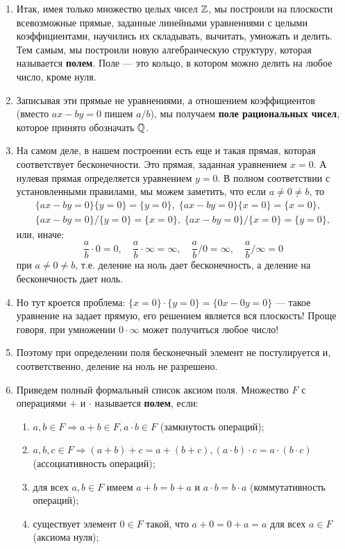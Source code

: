 \begin{enumerate}
\item Итак, имея только множество целых чисел $\mathbb Z$, мы построили на плоскости всевозможные прямые, заданные линейными уравнениями с целыми коэффициентами, научились их складывать, вычитать, умножать и делить. Тем самым, мы построили новую алгебраическую структуру, которая называется \textbf{полем}. Поле --- это кольцо, в котором можно делить на любое число, кроме нуля.
\item Записывая эти прямые не уравнениями, а отношением коэффициентов (вместо $ax-by=0$ пишем $a/b$), мы получаем \textbf{поле рациональных чисел}, которое принято обозначать $\mathbb Q$.
\item На самом деле, в нашем построении есть еще и такая прямая, которая соответствует бесконечности. Это прямая, заданная уравнением $x=0$. А нулевая прямая определяется уравнением $y=0$. В полном соответствии с установленными правилами, мы можем заметить, что если $a\ne 0 \ne b$, то
\begin{gather*}
\{ax-by=0\}\{y=0\}=\{y=0\},\;\{ax-by=0\}\{x=0\}=\{x=0\},\\ 
\{ax-by=0\}/\{y=0\}=\{x=0\},\;\{ax-by=0\}/\{x=0\}=\{y=0\},
\end{gather*}
или, иначе:
$$
\frac{a}{b}\cdot 0 = 0,\quad\frac{a}{b}\cdot\infty = \infty,\quad
\frac{a}{b}/ 0 = \infty,\quad\frac{a}{b}/\infty = 0
$$
при $a\ne 0\ne b$,
т.е. деление на ноль дает бесконечность, а деление на бесконечность дает ноль.
\item Но тут кроется проблема: $\{x=0\}\cdot\{y=0\}=\{0x-0y=0\}$ --- такое уравнение на задает прямую, его решением является вся плоскость! Проще говоря, при умножении $0\cdot\infty$ может получиться любое число!
\item Поэтому при определении поля бесконечный элемент не постулируется и, соответственно, деление на ноль не разрешено.
\item Приведем полный формальный список аксиом поля. Множество $F$ с операциями $+$ и $\cdot$ называется \textbf{полем}, если:
\begin{enumerate}[{\bf F}1)]
\item $a,b\in F\Rightarrow a+b\in F, a\cdot b\in F$ (замкнутость операций);
\item $a,b,c\in F\Rightarrow (a+b)+c=a+(b+c), (a\cdot b)\cdot c = a\cdot (b\cdot c)$ (ассоциативность операций);
\item для всех $a,b\in F$ имеем $a+b=b+a$ и $a\cdot b=b\cdot a$ (коммутативность операций);
\item существует элемент $0\in F$ такой, что $a+0=0+a=a$ для всех $a\in F$ (аксиома нуля);

\end{enumerate}
\end{enumerate}
